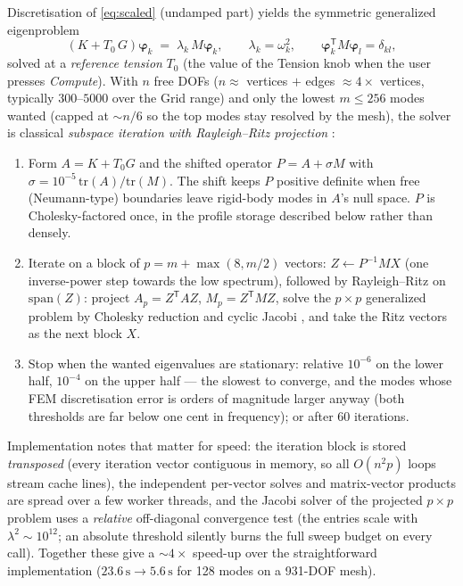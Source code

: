 \documentclass[11pt,a4paper]{article}
\begin{document}
Discretisation of \eqref{eq:scaled} (undamped part) yields the symmetric
generalized eigenproblem
%
\begin{equation}
  \left( K + T_0\, G \right) \bm\varphi_k \;=\; \lambda_k\, M \bm\varphi_k ,
  \qquad \lambda_k = \omega_k^2,
  \qquad \bm\varphi_k^{\mathsf T} M \bm\varphi_l = \delta_{kl},
  \label{eq:gep}
\end{equation}
%
solved at a \emph{reference tension} $T_0$ (the value of the Tension knob
when the user presses \emph{Compute}). With $n$ free DOFs
($n \approx$ vertices $+$ edges $\approx 4\times$ vertices, typically
$300$--$5000$ over the Grid range) and only the lowest $m \le 256$ modes
wanted (capped at $\sim n/6$ so the top modes stay resolved by the mesh),
the solver is
classical \emph{subspace iteration with Rayleigh--Ritz projection}
\cite{bathe-wilson,bathe}:
%
\begin{enumerate}
\item Form $A = K + T_0 G$ and the shifted operator $P = A + \sigma M$ with
  $\sigma = 10^{-5}\,\mathrm{tr}(A)/\mathrm{tr}(M)$. The shift keeps $P$
  positive definite when free (Neumann-type) boundaries leave rigid-body
  modes in $A$'s null space. $P$ is Cholesky-factored once, in the profile
  storage described below rather than densely.
\item Iterate on a block of $p = m + \max(8, m/2)$ vectors:
  $Z \leftarrow P^{-1} M X$ (one inverse-power step towards the low
  spectrum), followed by Rayleigh--Ritz on $\mathrm{span}(Z)$: project
  $A_p = Z^{\mathsf T} A Z$, $M_p = Z^{\mathsf T} M Z$, solve the $p\times p$
  generalized problem by Cholesky reduction and cyclic Jacobi
  \cite{golub}, and take the Ritz vectors as the next block $X$.
\item Stop when the wanted eigenvalues are stationary: relative $10^{-6}$
  on the lower half, $10^{-4}$ on the upper half --- the slowest to
  converge, and the modes whose FEM discretisation error is orders of
  magnitude larger anyway (both thresholds are far below one cent in
  frequency); or after 60 iterations.
\end{enumerate}
%
Implementation notes that matter for speed: the iteration block is stored
\emph{transposed} (every iteration vector contiguous in memory, so all
$O(n^2 p)$ loops stream cache lines), the independent per-vector solves
and matrix-vector products are spread over a few worker threads, and the
Jacobi solver of the projected $p \times p$ problem uses a
\emph{relative} off-diagonal convergence test (the entries scale with
$\lambda^2 \sim 10^{12}$; an absolute threshold silently burns the full
sweep budget on every call). Together these give a $\sim\!4\times$
speed-up over the straightforward implementation ($23.6\,\mathrm{s}
\rightarrow 5.6\,\mathrm{s}$ for 128 modes on a 931-DOF mesh).
%
\end{document}
